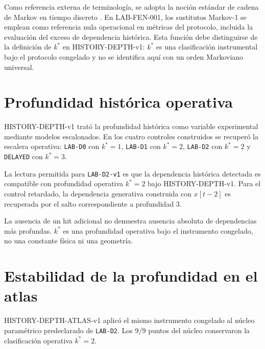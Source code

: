 \begin{observation}
Como referencia externa de terminología, se adopta la noción estándar de cadena de Markov en tiempo discreto \parencite{norris1997markov}. En LAB-FEN-001, los sustitutos Markov-1 se emplean como referencia nula operacional en métricas del protocolo, incluida la evaluación del exceso de dependencia histórica. Esta función debe distinguirse de la definición de \(k^\ast\) en HISTORY-DEPTH-v1: \(k^\ast\) es una clasificación instrumental bajo el protocolo congelado y no se identifica aquí con un orden Markoviano universal.
\end{observation}

\section*{Profundidad histórica operativa}

\begin{observation}
HISTORY-DEPTH-v1 trató la profundidad histórica como variable experimental mediante modelos escalonados. En los cuatro controles construidos se recuperó la escalera operativa: \texttt{LAB-D0} con \(k^\ast=1\), \texttt{LAB-D1} con \(k^\ast=2\), \texttt{LAB-D2} con \(k^\ast=2\) y \texttt{DELAYED} con \(k^\ast=3\).
\end{observation}

\begin{observation}
La lectura permitida para \texttt{LAB-D2-v1} es que la dependencia histórica detectada es compatible con profundidad operativa \(k^\ast=2\) bajo HISTORY-DEPTH-v1. Para el control retardado, la dependencia generativa construida con \(x[t-2]\) es recuperada por el salto correspondiente a profundidad 3.
\end{observation}

\begin{observation}
La ausencia de un hit adicional no demuestra ausencia absoluta de dependencias más profundas. \(k^\ast\) es una profundidad operativa bajo el instrumento congelado, no una constante física ni una geometría.
\end{observation}

\section*{Estabilidad de la profundidad en el atlas}

\begin{observation}
HISTORY-DEPTH-ATLAS-v1 aplicó el mismo instrumento congelado al núcleo paramétrico predeclarado de \texttt{LAB-D2}. Los 9/9 puntos del núcleo conservaron la clasificación operativa \(k^\ast=2\).
\end{observation}

